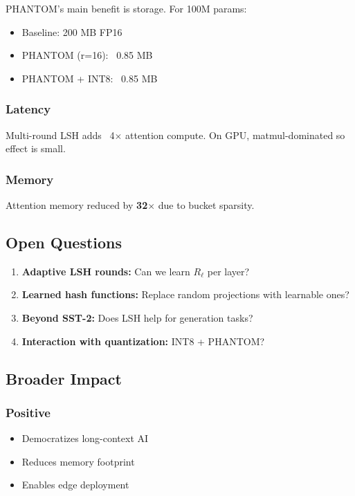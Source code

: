 PHANTOM's main benefit is storage. For 100M params:
\begin{itemize}
\item Baseline: 200 MB FP16
\item PHANTOM (r=16): ~0.85 MB
\item PHANTOM + INT8: ~0.85 MB

\end{itemize}
\subsubsection{Latency}

Multi-round LSH adds ~4$\times$ attention compute. On GPU, matmul-dominated so 
effect is small.

\subsubsection{Memory}

Attention memory reduced by \textbf{32$\times$} due to bucket sparsity.

\subsection{Open Questions}

\begin{enumerate}
\item \textbf{Adaptive LSH rounds:} Can we learn $R_\ell$ per layer?
\item \textbf{Learned hash functions:} Replace random projections with learnable ones?
\item \textbf{Beyond SST-2:} Does LSH help for generation tasks?
\item \textbf{Interaction with quantization:} INT8 + PHANTOM?

\end{enumerate}
\subsection{Broader Impact}

\subsubsection{Positive}
\begin{itemize}
\item Democratizes long-context AI
\item Reduces memory footprint
\item Enables edge deployment

\end{itemize}
